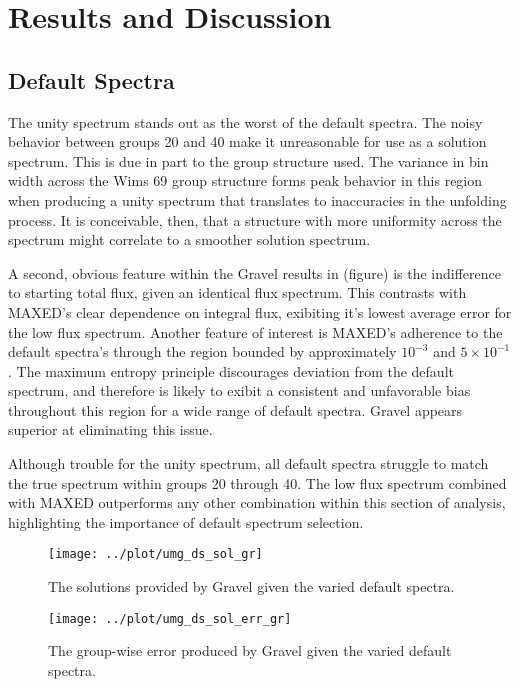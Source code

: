 \documentclass[journal]{IEEEtran}
\begin{document}
\section{Results and Discussion}

\subsection{Default Spectra}

The unity spectrum stands out as the worst of the default spectra.
The noisy behavior between groups 20 and 40 make it unreasonable for use as a solution spectrum.
This is due in part to the group structure used.
The variance in bin width across the Wims 69 group structure forms peak behavior in this region when producing a unity spectrum that translates to inaccuracies in the unfolding process.
It is conceivable, then, that a structure with more uniformity across the spectrum might correlate to a smoother solution spectrum.

A second, obvious feature within the Gravel results in (figure) is the indifference to starting total flux, given an identical flux spectrum.
This contrasts with MAXED's clear dependence on integral flux, exibiting it's lowest average error for the low flux spectrum.
Another feature of interest is MAXED's adherence to the default spectra's through the region bounded by approximately $10^{-3}$ and $5 \times 10^{-1}$.
The maximum entropy principle discourages deviation from the default spectrum, and therefore is likely to exibit a consistent and unfavorable bias throughout this region for a wide range of default spectra.
Gravel appears superior at eliminating this issue.

Although trouble for the unity spectrum, all default spectra struggle to match the true spectrum within groups 20 through 40.
The low flux spectrum combined with MAXED outperforms any other combination within this section of analysis, highlighting the importance of default spectrum selection.


\begin{figure}[h!tb]
  \centering
  \texttt{[image: ../plot/umg\_ds\_sol\_gr]}
  \caption{The solutions provided by Gravel given the varied default spectra.}
  \label{fig:ds_sol_gr}
\end{figure}

\begin{figure}[h!tb]
  \centering
  \texttt{[image: ../plot/umg\_ds\_sol\_err\_gr]}
  \caption{The group-wise error produced by Gravel given the varied default spectra.}
  \label{fig:ds_err_gr}
\end{figure}
\end{document}
